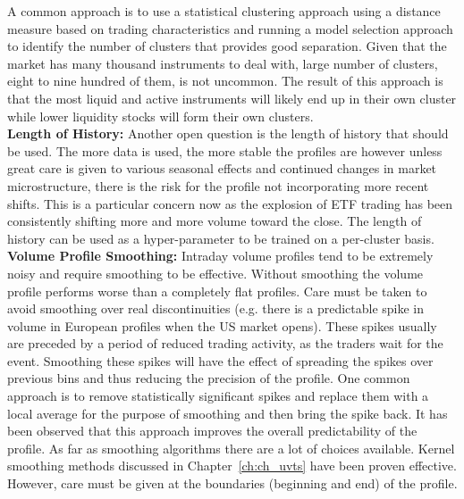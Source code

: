 A common approach is to use a statistical clustering approach using a distance measure based on trading characteristics and running a model selection approach to identify the number of clusters that provides good separation. Given that the market has many thousand instruments to deal with, large number of clusters, eight to nine hundred of them, is not uncommon. The result of this approach is that the most liquid and active instruments will likely end up in their own cluster while lower liquidity stocks will form their own clusters. \\


\noindent\textbf{Length of History:} Another open question is the length of history that should be used. The more data is used, the more stable the profiles are however unless great care is given to various seasonal effects and continued changes in market microstructure, there is the risk for the profile not incorporating more recent shifts. This is a particular concern now as the explosion of ETF trading has been consistently shifting more and more volume toward the close. The length of history can be used as a hyper-parameter to be trained on a per-cluster basis. \\


\noindent\textbf{Volume Profile Smoothing:} Intraday volume profiles tend to be extremely noisy and require smoothing to be effective. Without smoothing the volume profile performs worse than a completely flat profiles. Care must be taken to avoid smoothing over real discontinuities (e.g. there is a predictable spike in volume in European profiles when the US market opens). These spikes usually are preceded by a period of reduced trading activity, as the traders wait for the event. Smoothing these spikes will have the effect of spreading the spikes over previous bins and thus reducing the precision of the profile. One common approach is to remove statistically significant spikes and replace them with a local average for the purpose of smoothing and then bring the spike back. It has been observed that this approach improves the overall predictability of the profile. As far as smoothing algorithms there are a lot of choices available. Kernel smoothing methods discussed in Chapter~\ref{ch:ch_uvts} have been proven effective. However, care must be given at the boundaries (beginning and end) of the profile. \\



